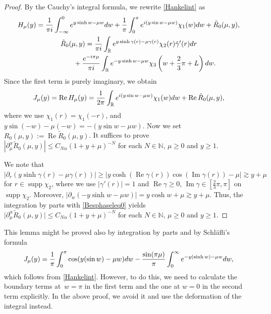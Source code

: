 \documentclass[10pt,a4paper]{article}
\numberwithin{equation}{section}
\def\R{\mathbb{R}}%
\DeclareMathOperator{\supp}{supp}%
\DeclareMathOperator{\re}{Re}%
\DeclareMathOperator{\im}{Im}%
\def\a{\alpha}
\def\c{\gamma}
\def\m{\mu}
\def\pa{\partial}
\begin{document}
\begin{proof}
By the Cauchy's integral formula, we rewrite \eqref{Hankelint} as
\begin{gather*}
H_{\m}(y)=\frac{1}{\pi {\rm i}}\int_{-\infty}^0{\rm e}^{y\sinh w-\m w}{\rm d}w+\frac{1}{\pi}\int_0^{\pi}{\rm e}^{{\rm i}(y\sin w-\m w)}\chi_1(w){\rm d}w+\tilde{R}_0(\m,y),\\
\tilde{R}_0(\m,y)=\frac{1}{\pi {\rm i}}\int_{\R}{\rm e}^{y\sinh \c(r)-\m \c(r)}\chi_2(r)\tilde{\c}'(r){\rm d}r\\
\phantom{\tilde{R}_0(\m,y)=}{}+\frac{{\rm e}^{-{\rm i}\pi\m}}{\pi {\rm i}}\int_{\R}{\rm e}^{-y\sinh w-\m w}\chi_3\left(w+\frac{2}{3}\pi+L\right){\rm d}w.
\end{gather*}
Since the first term is purely imaginary, we obtain
\begin{align*}
J_{\m}(y)=\re H_{\m}(y)=\frac{1}{2\pi}\int_{\R}{\rm e}^{{\rm i}(y\sin w-\m w)}\chi_1(w){\rm d}w+\re \tilde{R}_0(\m,y),
\end{align*}
where we use $\chi_1(r)=\chi_1(-r)$, \smash{$\supp \chi_1\subset \bigl(-\frac{3}{4}\pi,\frac{3}{4}\pi\bigr)$} and $y\sin(- w)-\m(-w)=-(y\sin w-\m w)$. Now we set $R_0(\m,y):=\re \tilde{R}_0(\m,y)$.
It suffices to prove $|\pa_{\m}^{\a}\tilde{R}_0(\m,y)|\leq C_{N\a}(1+y+\m)^{-N}$ for each $N\in\mathbb{N}$, $\m\geq 0$ and $y\geq 1$.

We note that $|\pa_r(y\sinh\c(r)-\m\c(r))|\geq |y\cosh (\re \c(r))\cos(\im \c(r))-\m|\gtrsim y+\m$ for $r\in \supp \chi_2$, where we use $|\c'(r)|=1$ and $\re\c\geq 0$, $\im \c\in [\frac{2}{3}\pi,\pi]$ on $\supp \chi_2$. Moreover, $|\pa_w(-y\sinh w-\m w)|=y\cosh w+\m \gtrsim y+\m$. Thus, the integration by parts with \eqref{Besphaseleq0} yields~${\big|\pa_{\m}^{\a}\tilde{R}_0(\m,y)\big|\leq C_{N\a}(1+y+\m)^{-N}}$ for each $N\in\mathbb{N}$, $\m\geq 0$ and $y\geq 1$.
\end{proof}

\begin{Remark}
This lemma might be proved also by integration by parts and by Schl\"afli's formula
\begin{align*}
J_{\m}(y)=\frac{1}{\pi}\int_0^{\pi}\cos (y(\sin w)-\m w){\rm d}w-\frac{\sin (\pi\m)}{\pi}\int_0^{\infty}{\rm e}^{-y(\sinh w)-\m w}{\rm d}w,
\end{align*}
which follows from \eqref{Hankelint}.
However, to do this, we need to calculate the boundary terms at~${w=\pi}$ in the first term and the one at $w=0$ in the second term explicitly. In the above proof, we avoid it and use the deformation of the integral instead.
\end{Remark}
\end{document}
